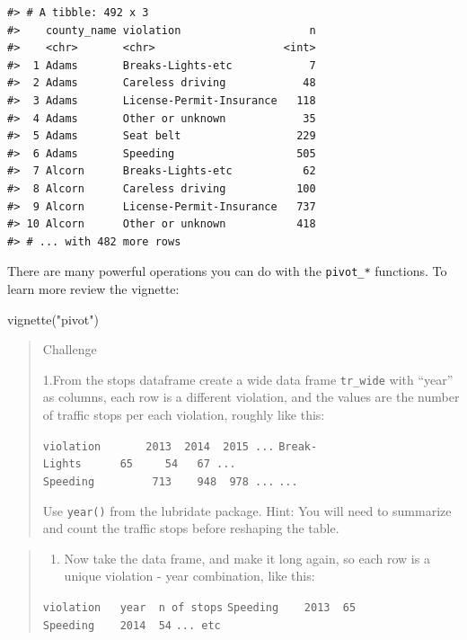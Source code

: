 \documentclass[
]{book}
\newenvironment{Shaded}{\begin{snugshade}}{\end{snugshade}}
\newcommand{\FunctionTok}[1]{\textcolor[rgb]{0.00,0.00,0.00}{#1}}
\newcommand{\NormalTok}[1]{#1}
\newcommand{\StringTok}[1]{\textcolor[rgb]{0.31,0.60,0.02}{#1}}
\providecommand{\tightlist}{%
  \setlength{\itemsep}{0pt}\setlength{\parskip}{0pt}}
\begin{document}
\begin{verbatim}
#> # A tibble: 492 x 3
#>    county_name violation                    n
#>    <chr>       <chr>                    <int>
#>  1 Adams       Breaks-Lights-etc            7
#>  2 Adams       Careless driving            48
#>  3 Adams       License-Permit-Insurance   118
#>  4 Adams       Other or unknown            35
#>  5 Adams       Seat belt                  229
#>  6 Adams       Speeding                   505
#>  7 Alcorn      Breaks-Lights-etc           62
#>  8 Alcorn      Careless driving           100
#>  9 Alcorn      License-Permit-Insurance   737
#> 10 Alcorn      Other or unknown           418
#> # ... with 482 more rows
\end{verbatim}

There are many powerful operations you can do with the \texttt{pivot\_*} functions. To learn more review the vignette:

\begin{Shaded}
\begin{Highlighting}[]
\FunctionTok{vignette}\NormalTok{(}\StringTok{"pivot"}\NormalTok{)}
\end{Highlighting}
\end{Shaded}

\begin{quote}
Challenge

1.From the stops dataframe create a wide data frame \texttt{tr\_wide} with
``year'' as columns, each row is a different violation,
and the values are the
number of traffic stops per each violation, roughly like this:

\texttt{violation\ \ \ \ \ \ \textbar{}\ 2013\ \textbar{}\ 2014\ \textbar{}\ 2015\ ...}
\texttt{Break-Lights\ \ \ \textbar{}\ \ \ 65\ \textbar{}\ \ \ \ 54\textbar{}\ \ \ 67\ ...}
\texttt{Speeding\ \ \ \ \ \ \ \textbar{}\ \ 713\ \textbar{}\ \ \ 948\textbar{}\ \ 978\ ...}
\texttt{...}

Use \texttt{year()} from the lubridate package. Hint: You will need to summarize
and count the traffic stops before reshaping the table.
\end{quote}

\begin{quote}
\begin{enumerate}
\def\labelenumi{\arabic{enumi}.}
\setcounter{enumi}{1}
\tightlist
\item
  Now take the data frame, and make it long again, so each row is a
  unique violation - year combination, like this:
\end{enumerate}

\texttt{violation\ \ \textbar{}\ year\ \textbar{}\ n\ of\ stops}
\texttt{Speeding\ \ \ \textbar{}\ 2013\ \textbar{}\ 65}
\texttt{Speeding\ \ \ \textbar{}\ 2014\ \textbar{}\ 54}
\texttt{...\ etc}
\end{quote}
\end{document}
